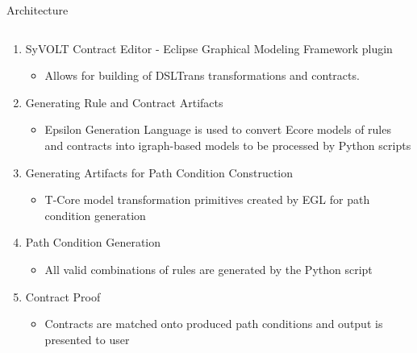 \documentclass[final,hyperref={pdfpagelabels=false}]{beamer}
\begin{document}
\begin{frame}{}
\begin{columns}[t,totalwidth=\linewidth]
\begin{column}{1\linewidth}
\begin{block}{Architecture}
\begin{columns}[c,totalwidth=\linewidth]
\begin{column}{.585\linewidth}
\begin{center}
\begin{enumerate}
\setlength\itemsep{1pt}
\setlength{\parskip}{0pt}
\footnotesize
\item SyVOLT Contract Editor - Eclipse Graphical Modeling Framework plugin
\begin{itemize}
\footnotesize
\item Allows for building of DSLTrans transformations and contracts.
\end{itemize}
\vspace{-10pt}
\item Generating Rule and Contract Artifacts
\begin{itemize}
\footnotesize
\item Epsilon Generation Language is used to convert Ecore
models of rules and contracts into igraph-based models to be processed by Python scripts
\end{itemize}
\vspace{-10pt}
\item Generating Artifacts for Path Condition Construction
\begin{itemize}
\footnotesize
\item T-Core model transformation primitives created by EGL for path condition generation
\end{itemize}
\vspace{-10pt}
\item Path Condition Generation
\begin{itemize}
\footnotesize
\item All valid combinations of rules are generated by the Python script
\end{itemize}
\vspace{-10pt}
\item Contract Proof
\begin{itemize}
\footnotesize
\item Contracts are matched onto produced path conditions and output is presented to user
\end{itemize}

\end{enumerate} 

\vspace{2.6cm}
        \end{center}
        \end{column}
        \end{columns}
       
       \vspace{-3cm}
        \end{block}
        

\end{column}
\end{columns}
\end{frame}
\end{document}
